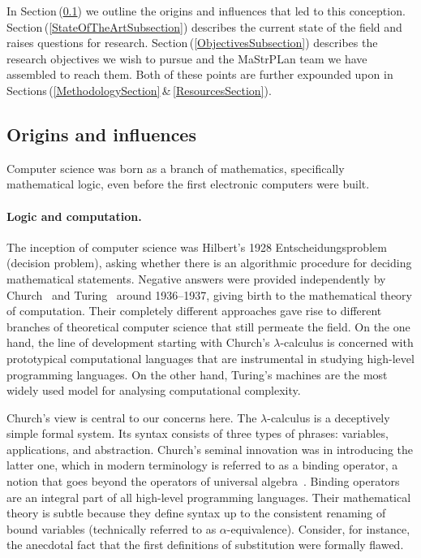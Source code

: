 \documentclass[11pt,twocolumn]{article}
\newcommand{\erc}{{\small\sf MaStrPLan}}
\newcommand{\pref}[1]{\,(\ref{#1})}
\newcommand{\lcalculus}{\mbox{$\lambda$-calculus}}
\begin{document}
In Section\pref{Origins} we outline the origins and influences that led
to this conception. %
Section\pref{StateOfTheArtSubsection} describes the current state of the
field and raises questions for research.  %
Section\pref{ObjectivesSubsection} describes the research objectives we wish
to pursue and the {\erc} team we have assembled to reach them.  Both of these points
are further expounded upon in
Sections\,(\ref{MethodologySection}\,\&\,\ref{ResourcesSection}).

\subsection{Origins and influences}
\label{Origins}

Computer science was born as a branch of mathematics, specifically
mathematical logic, even before the first electronic computers were built.

\paragraph{Logic and computation.}

The inception of computer science was Hilbert's %
1928 Entscheidungsproblem (decision problem),
asking whether there is an algorithmic procedure for deciding mathematical
statements.  Negative answers were provided independently by
Church~\cite{Church1936} and Turing~\cite{Turing} around 1936--1937,
giving birth to the mathematical theory of computation.  Their completely
different approaches gave rise to different branches of theoretical
computer science that still permeate the field.  
On the one hand, the line
of development starting with Church's {\lcalculus} %
is concerned with prototypical computational languages that are
instrumental in studying high-level programming languages.  
On the other hand, Turing's machines %
are the most widely 
used model for analysing computational complexity.

Church's view is central to our concerns here.  The {\lcalculus} is a
deceptively simple formal system.  Its syntax consists of three types of
phrases: variables, applications, and abstraction.  Church's seminal
innovation was in introducing the latter one, 
which in modern terminology is referred to as a binding operator, a notion
that goes beyond the operators of universal algebra~\cite{Birkhoff}.
Binding operators are an integral part of all high-level  programming
languages.  Their mathematical theory is subtle %
because they define syntax up to the consistent renaming of bound
variables (technically referred to as \mbox{$\alpha$-equivalence}).
Consider, for instance, the anecdotal fact that the first definitions of
substitution were formally flawed.  
\end{document}
